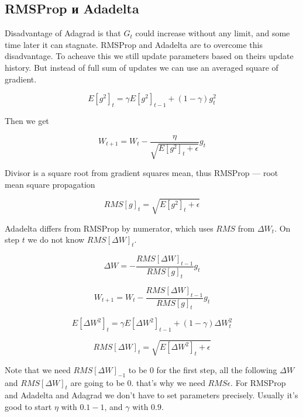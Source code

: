 \subsection{RMSProp и Adadelta}

Disadvantage of Adagrad is that $G_{t}$ could increase without any limit, and some time later it can stagnate. RMSProp and Adadelta are to overcome this disadvantage. To acheave this we still update parameters based on theirs update history. But instead of full sum of updates we can use an averaged square of gradient.

\begin{equation}
    E[g^2]_t = \gamma E[g^2]_{t-1} + (1 - \gamma) g^2_t
\end{equation}

Then we get

\begin{equation}
    W_{t+1} = W_{t} - \frac{\eta}{\sqrt{E[g^2]_t + \epsilon}} g_{t}
\end{equation}

Divisor is a square root from gradient squares mean, thus RMSProp — root mean square propagation

\begin{equation}
    RMS[g]_t = \sqrt {E[g^2]_t + \epsilon }
\end{equation}

Adadelta differs from RMSProp by numerator, which uses $RMS$ from $\Delta W_t$. On step $t$ we do not know $RMS[\Delta W]_{t}$.

\begin{equation}
    \Delta W = -\frac{RMS[\Delta W]_{t-1}}{RMS[g]_{t}}g_{t}
\end{equation}

\begin{equation}
    W_{t+1} = W_{t} - \frac{RMS[\Delta W]_{t-1}}{RMS[g]_{t}}g_{t}
\end{equation}

\begin{equation}
    E[\Delta W^2]_t = \gamma E[\Delta W^2]_{t-1} + (1 - \gamma) \Delta W^2_t
\end{equation}

\begin{equation}
    RMS[\Delta W]_{t} = \sqrt{E[\Delta W^2]_t + \epsilon}
\end{equation}

Note that we need $RMS[\Delta W]_{-1}$ to be $0$ for the first step, all the following $\Delta W$ and $RMS[\Delta W]_{t}$ are going to be $0$. that's why we need $RMS \epsilon$. For RMSProp and Adadelta and Adagrad we don't have to set parameters precisely. Usually it's good to start $\eta$ with $0.1 - 1$, and $\gamma$ with $0.9$.

